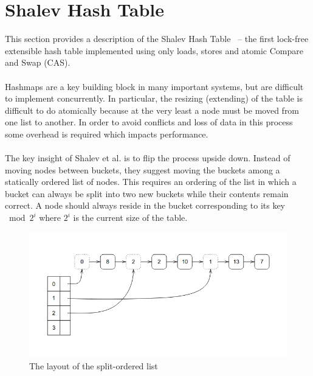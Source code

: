 \documentclass{uit-thesis}
\begin{document}
\section{Shalev Hash Table}\label{sec:hashmap}
This section provides a description of the Shalev Hash Table~\cite{Shalev2006} -- the first lock-free extensible hash table implemented using only loads, stores and atomic Compare and Swap (CAS).
\\\\
Hashmaps are a key building block in many important systems, but are difficult to implement concurrently. In particular, the resizing (extending) of the table is difficult to do atomically because at the very least a node must be moved from one list to another. In order to avoid conflicts and loss of data in this process some overhead is required which impacts performance.
\\\\
The key insight of Shalev et al. is to flip the process upside down. Instead of moving nodes between buckets, they suggest moving the buckets among a statically ordered list of nodes. This requires an ordering of the list in which a bucket can always be split into two new buckets while their contents remain correct. A node should always reside in the bucket corresponding to its key $\bmod{2^i}$ where $2^i$ is the current size of the table.
\begin{figure}
    \includegraphics[width=\textwidth]{split-ordered-list-diagram.png}
\caption{The layout of the split-ordered list}
\label{fig:split-order}
\end{figure}
\end{document}

